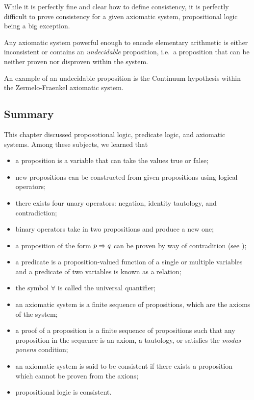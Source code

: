 \br
While it is perfectly fine and clear how to define consistency, it is perfectly difficult to prove consistency for a given axiomatic system, propositional logic being a big exception.
\er

\bt
Any axiomatic system powerful enough to encode elementary arithmetic is either inconsistent or contains an \emph{undecidable} proposition, i.e.\ a proposition that can be neither proven nor disproven within the system.
\et

An example of an undecidable proposition is the Continuum hypothesis within the Zermelo-Fraenkel axiomatic system.  

\subsection{Summary}

This chapter discussed proposotional logic, predicate logic, and axiomatic
systems. Among these subjects, we learned that
\begin{itemize}
\item a proposition is a variable that can take the values true or false;
\item new propositions can be constructed from given propositions using
logical operators;
\item there exists four unary operators: negation, identity tautology, and
contradiction;
\item binary operators take in two propositions and produce a new one;
\item a proposition of the form $p \Rightarrow q$ can be proven by way of
contradition (see );
\item a predicate is a proposition-valued function of a single or multiple
variables and a predicate of two variables is known as a relation;
\item the symbol $\forall$ is called the universal quantifier;
\item an axiomatic system is a finite sequence of propositions, which are the
axioms of the system;
\item a proof of a proposition is a finite sequence of propositions such that
any proposition in the sequence is an axiom, a tautology, or satisfies the
\emph{modus ponens} condition;
\item an axiomatic system is said to be consistent if there exists a
proposition which cannot be proven from the axions;
\item propositional logic is consistent.
\end{itemize}
